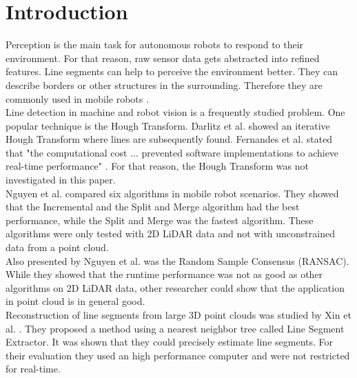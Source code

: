 \documentclass{scp}
\begin{document}
\section{Introduction} 
\thispagestyle{empty}
Perception is the main task for autonomous robots to respond to their environment. For that reason, raw sensor data gets abstracted into refined features. Line segments can help to perceive the environment better. They can describe borders or other structures in the surrounding. Therefore they are commonly used in mobile robots \cite{Zhang}. \\
Line detection in machine and robot vision is a frequently studied problem. One popular technique is the Hough Transform. Darlitz et al. \cite{Dalitz} showed an iterative Hough Transform where lines are subsequently found. Fernandes et al. stated that "the computational cost ... prevented software implementations to achieve real-time performance" \cite{Fernandes}. For that reason, the Hough Transform was not investigated in this paper. \\
Nguyen et al. \cite{Nguyen} compared six algorithms in mobile robot scenarios. They showed that the Incremental and the Split and Merge algorithm had the best performance, while the Split and Merge was the fastest algorithm. These algorithms were only tested with 2D LiDAR data and not with unconstrained data from a point cloud. \\
Also presented by Nguyen et al. was the Random Sample Consensus (RANSAC). While they showed that the runtime performance was not as good as other algorithms on 2D LiDAR data, other researcher could show that the application in point cloud is in general good.\\
Reconstruction of line segments from large 3D point clouds was studied by Xin et al. \cite{Xin}. They proposed a method using a nearest neighbor tree called Line Segment Extractor. It was shown that they could precisely estimate line segments. For their evaluation they used an high performance computer and were not restricted for real-time.   

\end{document}
